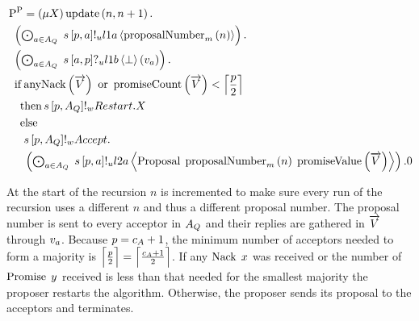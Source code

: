 \begin{align*}
&\Pp{} = \Mu{X} \update{n}{n + 1} .\\
&\Indent{1}\DotForall{\AcceptorIndex\in\AQ}{\SendUnreliableP{s}{\ProposerIndex}{\AcceptorIndex}{\LOneA}{\proposalNumber{n}{m}}} .\\
&\Indent{1}\DotForall{\AcceptorIndex\in\AQ}{\ReceiveUnreliableP{s}{\AcceptorIndex}{\ProposerIndex}{\LOneB}{\bot}{v_{\AcceptorIndex}}} .\\
&\Indent{1}\If{\anyNack{\VectorV} \tOr \promiseCount{\VectorV} < \ceil{\frac{\ProposerIndex}{2}}}\\
&\Indent{2}\Then{\SendWeaklyP{s}{\ProposerIndex}{\AQ}{\Restart}{X}}\\
&\Indent{2}\Else{\\
&\Indent{3}\SendWeaklyP{s}{\ProposerIndex}{\AQ}{\Accept}{\\
&\Indent{3}\DotForall{\AcceptorIndex\in\AQ}{\SendUnreliableP{s}{\ProposerIndex}{\AcceptorIndex}{\LTwoA}{\ProposalC{\proposalNumber{n}{m}}{\promiseValue{\VectorV}}}}.\End
}}
\end{align*}

At the start of the recursion $n$ is incremented to make sure every run of the recursion uses a different $n$ and thus a different proposal number.
The proposal number is sent to every acceptor in $A_Q$ and their replies are gathered in $\overrightarrow{V}$ through $v_{a}$.
Because $p = c_A + 1$, the minimum number of acceptors needed to form a majority is $\Big\lceil \frac{p}{2} \Big\rceil = \Big\lceil \frac{c_A + 1}{2} \Big\rceil$.
If any $\operatorname{Nack}\; x$ was received or the number of $\operatorname{Promise}\; y$ received is less than that needed for the smallest majority the proposer restarts the algorithm.
Otherwise, the proposer sends its proposal to the acceptors and terminates.

